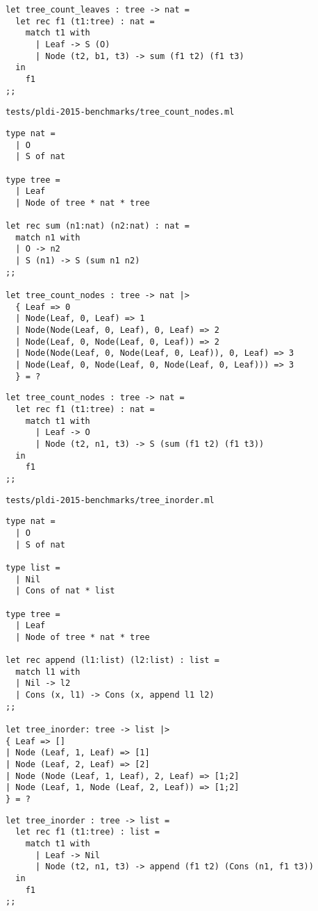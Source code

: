 \begin{verbatim}
let tree_count_leaves : tree -> nat =
  let rec f1 (t1:tree) : nat =
    match t1 with
      | Leaf -> S (O)
      | Node (t2, b1, t3) -> sum (f1 t2) (f1 t3)
  in
    f1
;;
\end{verbatim}

\noindent\large\texttt{tests/pldi-2015-benchmarks/tree\_count\_nodes.ml}
\begin{verbatim}
type nat =
  | O
  | S of nat

type tree =
  | Leaf
  | Node of tree * nat * tree

let rec sum (n1:nat) (n2:nat) : nat =
  match n1 with
  | O -> n2
  | S (n1) -> S (sum n1 n2)
;;

let tree_count_nodes : tree -> nat |>
  { Leaf => 0
  | Node(Leaf, 0, Leaf) => 1
  | Node(Node(Leaf, 0, Leaf), 0, Leaf) => 2
  | Node(Leaf, 0, Node(Leaf, 0, Leaf)) => 2
  | Node(Node(Leaf, 0, Node(Leaf, 0, Leaf)), 0, Leaf) => 3
  | Node(Leaf, 0, Node(Leaf, 0, Node(Leaf, 0, Leaf))) => 3
  } = ?
\end{verbatim}

\begin{verbatim}
let tree_count_nodes : tree -> nat =
  let rec f1 (t1:tree) : nat =
    match t1 with
      | Leaf -> O
      | Node (t2, n1, t3) -> S (sum (f1 t2) (f1 t3))
  in
    f1
;;
\end{verbatim}

\noindent\large\texttt{tests/pldi-2015-benchmarks/tree\_inorder.ml}
\begin{verbatim}
type nat =
  | O
  | S of nat

type list =
  | Nil
  | Cons of nat * list

type tree =
  | Leaf
  | Node of tree * nat * tree

let rec append (l1:list) (l2:list) : list =
  match l1 with
  | Nil -> l2
  | Cons (x, l1) -> Cons (x, append l1 l2)
;;

let tree_inorder: tree -> list |>
{ Leaf => []
| Node (Leaf, 1, Leaf) => [1]
| Node (Leaf, 2, Leaf) => [2]
| Node (Node (Leaf, 1, Leaf), 2, Leaf) => [1;2]
| Node (Leaf, 1, Node (Leaf, 2, Leaf)) => [1;2]
} = ?
\end{verbatim}

\begin{verbatim}
let tree_inorder : tree -> list =
  let rec f1 (t1:tree) : list =
    match t1 with
      | Leaf -> Nil
      | Node (t2, n1, t3) -> append (f1 t2) (Cons (n1, f1 t3))
  in
    f1
;;
\end{verbatim}

